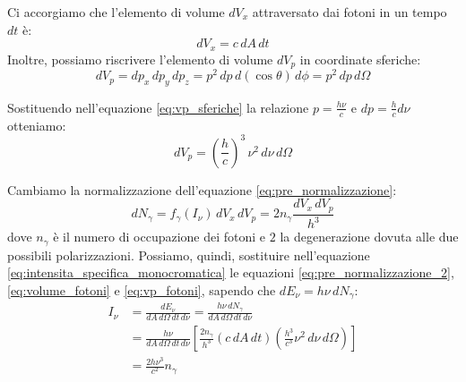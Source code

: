 \documentclass[11pt, a4paper, oneside]{scrreprt}
\begin{document}
Ci accorgiamo che l'elemento di volume $dV_x$ attraversato dai fotoni in un tempo $dt$ è:
\begin{equation} \label{eq:volume_fotoni}
    dV_x = c \, dA \, dt
\end{equation}
Inoltre, possiamo riscrivere l'elemento di volume $dV_p$ in coordinate sferiche:
\begin{equation} \label{eq:vp_sferiche}
    dV_p = dp_x \, dp_y \, dp_z = p^2 \, dp \, d(\cos\theta) \, d\phi = p^2 \, dp \, d\Omega
\end{equation}

Sostituendo nell'equazione \eqref{eq:vp_sferiche} la relazione $p = \frac{h\nu}{c}$ e $dp = \frac{h}{c} d\nu$ otteniamo:
\begin{equation} \label{eq:vp_fotoni}
    dV_p = \left(\frac{h}{c}\right)^3 \, \nu^2 \, d\nu \, d\Omega
\end{equation}

Cambiamo la normalizzazione dell'equazione \eqref{eq:pre_normalizzazione}:
\begin{equation} \label{eq:pre_normalizzazione_2}
    dN_{\gamma} = f_{\gamma}(I_{\nu}) \, dV_x \, dV_p = 2 n_{\gamma} \frac{dV_x \, dV_p}{h^3}
\end{equation}
dove $n_{\gamma}$ è il numero di occupazione dei fotoni e $2$ la degenerazione dovuta alle due possibili polarizzazioni.
Possiamo, quindi, sostituire nell'equazione \eqref{eq:intensita_specifica_monocromatica} le equazioni \eqref{eq:pre_normalizzazione_2}, \eqref{eq:volume_fotoni} e \eqref{eq:vp_fotoni}, sapendo che $dE_{\nu} = h\nu \, dN_{\gamma}$:
\begin{align}
    I_{\nu} &= \frac{dE_\nu}{dA \, d\Omega \, dt \, d\nu} = \frac{h\nu \, dN_{\gamma}}{dA \, d\Omega \, dt \, d\nu} \nonumber \\[0.5em]
    &= \frac{h\nu}{dA \, d\Omega \, dt \, d\nu} \left[ \frac{2 n_{\gamma}}{h^3} \left(c \, dA \, dt\right) \left( \frac{h^3}{c^3} \nu^2 \, d\nu \, d\Omega \right) \right] \nonumber \\[0.5em]
    &= \frac{2 h \nu^3}{c^2} n_{\gamma}
\end{align}
\end{document}
